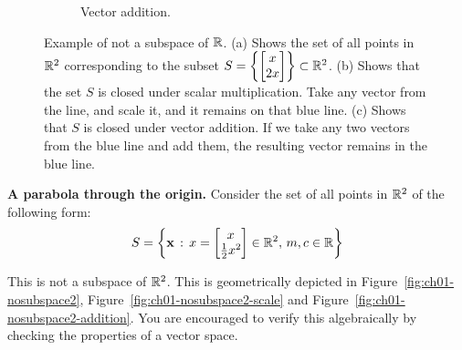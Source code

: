 \begin{figure}[h]
\begin{subfigure}[b]{0.32\textwidth}
        \caption{Vector addition.}
        \label{fig:ch01-nosubspace1-addition}
    \end{subfigure}
    \caption{Example of not a subspace of $\mathbb{R}$. (a) Shows the set of all points in $\mathbb{R}^2$ corresponding to the subset $S = \left\{ \bmxc x \\ 2 x\emx\right\} \subset \mb{R}^2$. (b) Shows that the set $S$ is closed under scalar multiplication. Take any vector from the line, and scale it, and it remains on that blue line. (c) Shows that $S$ is closed under vector addition. If we take any two vectors from the blue line and add them, the resulting vector remains in the blue line.}
\end{figure}

\begin{boxedstuff}
\begin{example}
    \textbf{A parabola through the origin.} Consider the set of all points in $\mathbb{R}^2$ of the following form:
    \[ S = \lc \mf{x} \, : \, x = \bmxc x \\ \frac{1}{2}x^2 \emx \in \mb{R}^2, \, m, c \in \mb{R} \rc \]

    This is not a subspace of $\mathbb{R}^2$. This is geometrically depicted in Figure~\ref{fig:ch01-nosubspace2}, Figure~\ref{fig:ch01-nosubspace2-scale} and Figure~\ref{fig:ch01-nosubspace2-addition}. You are encouraged to verify this algebraically by checking the properties of a vector space.
    \label{example:nosubspace-parabola}
\end{example}
\end{boxedstuff}
